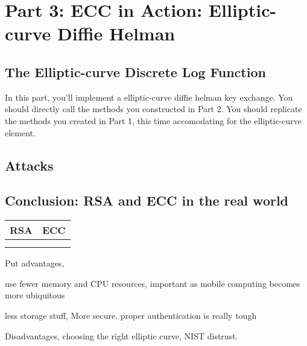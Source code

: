 \documentclass{article}
\begin{document}
\section*{Part 3: ECC in Action: Elliptic-curve Diffie Helman}

\subsection*{The Elliptic-curve Discrete Log Function}

\begin{tcolorbox}
    In this part, you'll implement a elliptic-curve diffie helman key exchange. You should directly call the methods you constructed in Part 2. You should replicate the methods you created in Part 1, this time accomodating for the elliptic-curve element.
\end{tcolorbox}

\subsection*{Attacks}


\subsection*{Conclusion: RSA and ECC in the real world}


\begin{center}
    \begin{tabular}{c|c}
        RSA & ECC \\
        \hline \\
         & 
    \end{tabular}
\end{center}

Put advantages, 

use fewer memory and CPU resources, important as mobile computing becomes more ubiquitous



less storage stuff, More secure. proper authentication is really tough

Disadvantages, choosing the right elliptic curve, NIST distrust.
\end{document}

